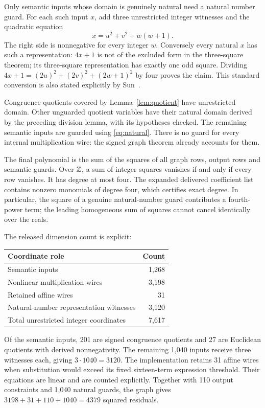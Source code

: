 \documentclass[11pt,a4paper]{article}
\theoremstyle{definition}\newtheorem{definition}[theorem]{Definition}
\theoremstyle{remark}\newtheorem{remark}[theorem]{Remark}
\numberwithin{equation}{section}
\begin{document}
Only semantic inputs whose domain is genuinely natural need a natural
number guard. For each such input \(x\), add three unrestricted
integer witnesses and the quadratic equation
\begin{equation}
 x=u^2+v^2+w(w+1).
\label{eq:natural}
\end{equation}
The right side is nonnegative for every integer \(w\). Conversely every
natural \(x\) has such a representation: \(4x+1\) is not of the
excluded form in the three-square theorem; its three-square
representation has exactly one odd square. Dividing
\(4x+1=(2u)^2+(2v)^2+(2w+1)^2\) by four proves the claim.
This standard conversion is also stated explicitly by Sun~\cite{sun}.

Congruence quotients covered by Lemma~\ref{lem:quotient} have unrestricted
domain. Other unguarded quotient variables have their natural domain
derived by the preceding division lemma, with its hypotheses checked.
The remaining semantic inputs are guarded using \eqref{eq:natural}.
There is no guard for every internal multiplication wire: the signed
graph theorem already accounts for them.

The final polynomial is the sum of the squares of all graph rows,
output rows and semantic guards. Over \(\mathbb Z\), a sum of integer squares
vanishes if and only if every row vanishes. It has degree at most four.
The expanded delivered coefficient list contains nonzero monomials of
degree four, which certifies exact degree. In particular, the square of
a genuine natural-number guard contributes a fourth-power term; the
leading homogeneous sum of squares cannot cancel identically over the
reals.

The released dimension count is explicit:
\begin{center}
\begin{tabular}{lr}\toprule
Coordinate role & Count\\\midrule
Semantic inputs &1,268\\
Nonlinear multiplication wires &3,198\\
Retained affine wires &31\\
Natural-number representation witnesses &3,120\\\midrule
Total unrestricted integer coordinates &7,617\\\bottomrule
\end{tabular}
\end{center}
Of the semantic inputs, 201 are signed congruence quotients and 27 are
Euclidean quotients with derived nonnegativity. The remaining 1,040
inputs receive three witnesses each, giving \(3\cdot1040=3120\).
The implementation retains 31 affine wires when substitution would
exceed its fixed sixteen-term expression threshold. Their equations
are linear and are counted explicitly. Together with 110 output
constraints and 1,040 natural guards, the graph gives
\(3198+31+110+1040=4379\) squared residuals.
\end{document}
